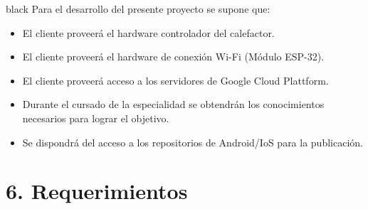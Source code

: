 \documentclass[
11pt, %
codirector, %
]{charter}
\begin{document}
\begin{consigna}{black}
Para el desarrollo del presente proyecto se supone que:

\begin{itemize}
	\item El cliente proveerá el hardware controlador del calefactor.
	\item El cliente proveerá el hardware de conexión Wi-Fi (Módulo ESP-32).
	\item El cliente proveerá acceso a los servidores de Google Cloud Plattform.
	\item Durante el cursado de la especialidad se obtendrán los conocimientos necesarios para lograr el objetivo.
	\item Se dispondrá del acceso a los repositorios de Android/IoS para la publicación.
\end{itemize}


\end{consigna}

\section{6. Requerimientos}
\label{sec:requerimientos}
\end{document}
